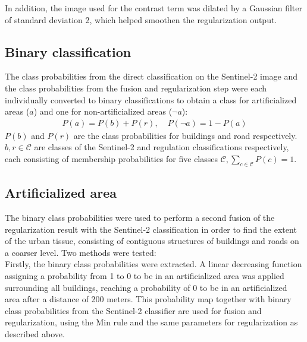 \documentclass[10pt]{article}
\begin{document}
In addition, the image used for the contrast term was dilated by a Gaussian filter of standard deviation 2, which helped smoothen the regularization output.

\subsection{Binary classification}
The class probabilities from the direct classification on the Sentinel-2 image and the class probabilities from the fusion and regularization step were each individually converted to binary classifications to obtain a class for artificialized areas ($a$) and one for non-artificialized areas ($\neg a$):
\begin{align}
    P(a)=P(b)+P(r),  &\;P(\neg a)= 1 - P(a)
\end{align}
$P(b)$ and $P(r)$ are the class probabilities for buildings and road respectively. $b, r\in \mathcal{C}$ are classes of the Sentinel-2 and regulation classifications respectively, each consisting of membership probabilities for five classes $\mathcal{C}, \sum_{c \in \mathcal{C}}P(c) = 1$.

\subsection{Artificialized area}
The binary class probabilities were used to perform a second fusion of the regularization result with the Sentinel-2 classification in order to find the extent of the urban tissue, consisting of contiguous structures of buildings and roads on a coarser level. Two methods were tested:\\

Firstly, the binary class probabilities were extracted. A linear decreasing function assigning a probability from 1 to 0 to be in an artificialized area was applied surrounding all buildings, reaching a probability of 0 to be in an artificialized area after a distance of 200 meters.
This probability map together with binary class probabilities from the Sentinel-2 classifier are used for fusion and regularization, using the Min rule and the same parameters for regularization as described above.\\
\end{document}
